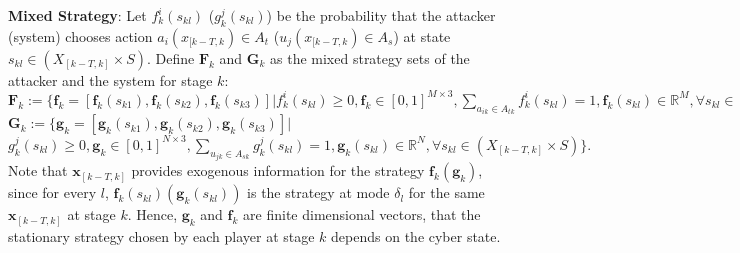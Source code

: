 \textbf{Mixed Strategy}: Let $f^{i}_{k}(s_{kl})$ ($g^{j}_{k}(s_{kl})$) be the probability that the attacker (system) chooses action $a_{i}(x_{[k-T,k}) \in A_{t}$ ($u_{j}(x_{[k-T,k}) \in A_{s}$) at state $s_{kl}\in (X_{[k-T,k]}\times S)$. Define $\mathbf{F}_{k}$ and $\mathbf{G}_{k}$ as the mixed strategy sets of the attacker and the system for stage $k$:
$\mathbf{F}_{k} :=\{\mathbf{f}_{k}= [\mathbf{f}_{k}(s_{k1}), \mathbf{f}_{k}(s_{k2}), \mathbf{f}_{k}(s_{k3})]
|f_{k}^{i}(s_{kl})\geq 0, \mathbf{f}_k \in [0,1]^{M\times 3},
\sum \limits_{a_{ik} \in A_{tk}}f_{k}^{i}(s_{kl}) = 1,\mathbf{f}_{k}(s_{kl})\in \mathbb{R}^{M}, \forall s_{kl} \in(X_{[k-T,k]}\times S)\},$
$\mathbf{G}_{k}:=\{\mathbf{g}_{k}= [\mathbf{g}_{k}(s_{k1}), \mathbf{g}_{k}(s_{k2}), \mathbf{g}_{k}(s_{k3})]|$
$g_{k}^{j}(s_{kl})\geq 0, \mathbf{g}_k \in [0,1]^{N \times 3}, %
\sum \limits_{u_{jk} \in A_{sk}}g_{k}^{j}(s_{kl}) = 1, \mathbf{g}_{k}(s_{kl}) \in \mathbb{R}^{N}, \forall s_{kl} \in (X_{[k-T,k]}\times S)\}. $ Note that $\mathbf{x}_{[k-T,k]}$ provides exogenous information for the strategy $\mathbf{f}_k (\mathbf{g}_k)$, since for every $l$, $\mathbf{f}_{k}(s_{kl}) (\mathbf{g}_{k}(s_{kl}))$ is the strategy at mode $\delta_l$ for the same $\mathbf{x}_{[k-T,k]}$ at stage $k$. Hence, $\mathbf{g}_k$ and $\mathbf{f}_k$ are finite dimensional vectors, that the stationary strategy chosen by each player at stage $k$ depends on the cyber state. %



